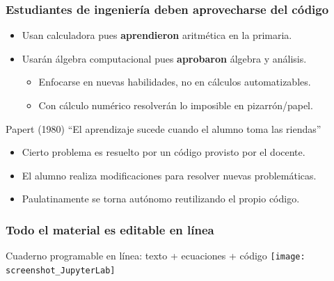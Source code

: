\documentclass[aspectratio=43]{beamer}
\begin{document}
\begin{frame}
	\frametitle{Estudiantes de ingeniería deben aprovecharse del código}
	\pause
	\begin{block}{}
		\begin{itemize}[<+->]
			\item Usan calculadora pues \textbf{aprendieron} aritmética en la primaria.
			\item Usarán álgebra computacional pues \textbf{aprobaron} álgebra y análisis.
			\begin{itemize}[<+->]
				\item Enfocarse en nuevas habilidades, no en cálculos automatizables.
				\item Con cálculo numérico resolverán lo imposible en pizarrón/papel.
			\end{itemize}
			\end{itemize}
	\end{block}
	\pause
	\begin{block}{}
		Papert (1980) ``El aprendizaje sucede cuando el alumno toma las riendas''
		\begin{itemize}[<+->]
			\item Cierto problema es resuelto por un código provisto por el docente.
			\item El alumno realiza modificaciones para resolver nuevas problemáticas.
			\item Paulatinamente se torna autónomo reutilizando el propio código.
		\end{itemize}
	\end{block}
\end{frame}


\begin{frame}
	\frametitle{Todo el material es editable en línea}
	\pause
	\begin{block}{Cuaderno programable en línea: texto + ecuaciones + código}
		\texttt{[image: screenshot\_JupyterLab]}
	\end{block}
\end{frame}
\end{document}
